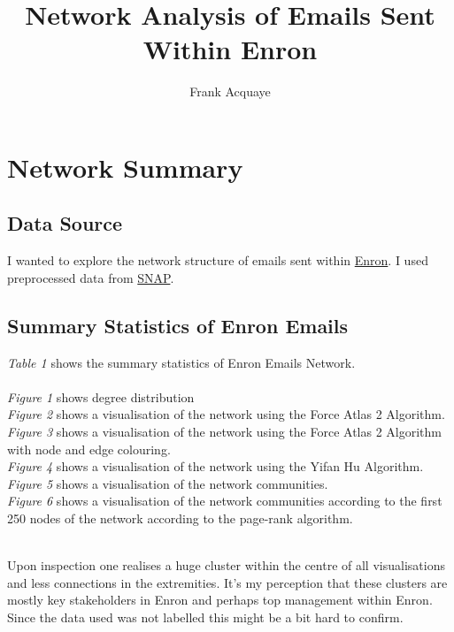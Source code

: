 \documentclass[11pt, oneside]{article}   	%
\title{Network Analysis of Emails Sent Within Enron}
\author{Frank Acquaye}
\begin{document}
	\maketitle
	
	\section{Network Summary}
	\subsection{Data Source}
	I wanted to explore the network structure of emails sent within \href{https://en.wikipedia.org/wiki/Enron}{Enron}. I used preprocessed data from  \href{http://snap.stanford.edu/data/email-Enron.html}{SNAP}.
	\subsection{Summary Statistics of Enron Emails}
	\emph{Table 1} shows the summary statistics of Enron Emails Network. \\
	\\
	\emph{Figure 1} shows degree distribution \\
	\emph{Figure 2} shows a visualisation of the network using the Force Atlas 2 Algorithm. \\
	\emph{Figure 3} shows a visualisation of the network using the Force Atlas 2 Algorithm with node and edge colouring. \\
	\emph{Figure 4} shows a visualisation of the network using the Yifan Hu Algorithm. \\
	\emph{Figure 5} shows a visualisation of the network communities. \\
	\emph{Figure 6} shows a visualisation of the network communities according to the first 250 nodes of the network according to the page-rank algorithm.\\
	\\
	\par
	Upon inspection one realises a huge cluster within the centre of all visualisations and less connections in the extremities. It's my perception that these clusters are mostly key stakeholders in Enron and perhaps top management within Enron. Since the data used was not labelled this might be a bit hard to confirm.
\end{document}
